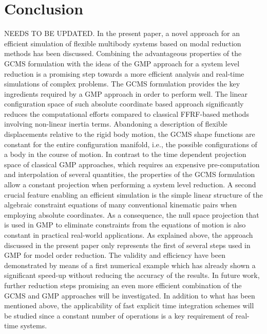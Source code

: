 \section{Conclusion}
NEEDS TO BE UPDATED. 
In the present paper, a novel approach for an efficient simulation of flexible multibody systems based on modal reduction methods has been discussed. Combining the advantageous properties of the GCMS formulation with the ideas of the GMP approach for a system level reduction is a promising step towards a more efficient analysis and real-time simulations of complex problems.
The GCMS formulation provides the key ingredients required by a GMP approach in order to perform well. The linear configuration space of such absolute coordinate based approach significantly reduces the computational efforts compared to classical FFRF-based methods involving non-linear inertia terms. 
Abandoning a description of flexible displacements relative to the rigid body motion, the GCMS shape functions are constant for the entire configuration manifold, i.e., the possible configurations of a body in the course of motion. 
In contrast to the time dependent projection space of classical GMP approaches, which requires an expensive pre-computation and interpolation of several quantities, the properties of the GCMS formulation allow a constant projection when performing a system level reduction.
A second crucial feature enabling an efficient simulation is the simple linear structure of the algebraic constraint equations of many conventional kinematic pairs when employing absolute coordinates. 
As a consequence, the null space projection that is used in GMP to eliminate constraints from the equations of motion is also constant in practical real-world applications. 
As explained above, the approach discussed in the present paper only represents the first of several steps used in GMP for model order reduction.
The validity and efficiency have been demonstrated by means of a first numerical example which has already shown a significant speed-up without reducing the accuracy of the results.
In future work, further reduction steps promising an even more efficient combination of the GCMS and GMP approaches will be investigated. 
In addition to what has been mentioned above, the applicability of fast explicit time integration schemes will be studied since a constant number of operations is a key requirement of real-time systems.


